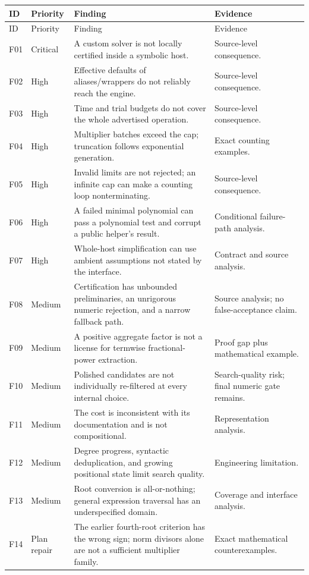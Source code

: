 \documentclass[11pt,letterpaper]{article}
\theoremstyle{definition}
\theoremstyle{remark}
\begin{document}
\begin{longtable}{@{}P{0.09\textwidth}P{0.15\textwidth}P{0.46\textwidth}P{0.21\textwidth}@{}}
\toprule ID & Priority & Finding & Evidence\\\midrule\endfirsthead
\toprule ID & Priority & Finding & Evidence\\\midrule\endhead
\bottomrule\endfoot
F01 & Critical & A custom solver is not locally certified inside a symbolic host. & Source-level consequence.\\[4pt]
F02 & High & Effective defaults of aliases/wrappers do not reliably reach the engine. & Source-level consequence.\\[4pt]
F03 & High & Time and trial budgets do not cover the whole advertised operation. & Source-level consequence.\\[4pt]
F04 & High & Multiplier batches exceed the cap; truncation follows exponential generation. & Exact counting examples.\\[4pt]
F05 & High & Invalid limits are not rejected; an infinite cap can make a counting loop nonterminating. & Source-level consequence.\\[4pt]
F06 & High & A failed minimal polynomial can pass a polynomial test and corrupt a public helper's result. & Conditional failure-path analysis.\\[4pt]
F07 & High & Whole-host simplification can use ambient assumptions not stated by the interface. & Contract and source analysis.\\[4pt]
F08 & Medium & Certification has unbounded preliminaries, an unrigorous numeric rejection, and a narrow fallback path. & Source analysis; no false-acceptance claim.\\[4pt]
F09 & Medium & A positive aggregate factor is not a license for termwise fractional-power extraction. & Proof gap plus mathematical example.\\[4pt]
F10 & Medium & Polished candidates are not individually re-filtered at every internal choice. & Search-quality risk; final numeric gate remains.\\[4pt]
F11 & Medium & The cost is inconsistent with its documentation and is not compositional. & Representation analysis.\\[4pt]
F12 & Medium & Degree progress, syntactic deduplication, and growing positional state limit search quality. & Engineering limitation.\\[4pt]
F13 & Medium & Root conversion is all-or-nothing; general expression traversal has an underspecified domain. & Coverage and interface analysis.\\[4pt]
F14 & Plan repair & The earlier fourth-root criterion has the wrong sign; norm divisors alone are not a sufficient multiplier family. & Exact mathematical counterexamples.\\
\end{longtable}
\end{document}
